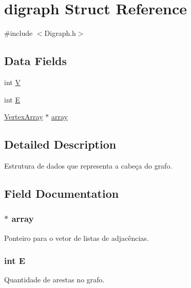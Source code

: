 \hypertarget{structdigraph}{}\section{digraph Struct Reference}
\label{structdigraph}


{\ttfamily \#include $<$Digraph.\+h$>$}

\subsection*{Data Fields}
\begin{DoxyCompactItemize}
\item 
int \hyperlink{structdigraph_a91e334f289dc11ba09da0df4a9c72123}{V}
\item 
int \hyperlink{structdigraph_a105a63272424d04208f33bac739acf98}{E}
\item 
\hyperlink{_digraph_8h_a34d078088dd1f710e4034c3fcb21918e}{Vertex\+Array} $\ast$ \hyperlink{structdigraph_af3759f34fe0a4cdbdbf6f6135e6c9cbe}{array}
\end{DoxyCompactItemize}


\subsection{Detailed Description}
Estrutura de dados que representa a cabeça do grafo. 

\subsection{Field Documentation}
\subsubsection[{\texorpdfstring{array}{array}}]{$\ast$ array}\hypertarget{structdigraph_af3759f34fe0a4cdbdbf6f6135e6c9cbe}{}\label{structdigraph_af3759f34fe0a4cdbdbf6f6135e6c9cbe}
Ponteiro para o vetor de listas de adjacências. 
\subsubsection[{\texorpdfstring{E}{E}}]{\setlength{\rightskip}{0pt plus 5cm}int E}\hypertarget{structdigraph_a105a63272424d04208f33bac739acf98}{}\label{structdigraph_a105a63272424d04208f33bac739acf98}
Quantidade de arestas no grafo. 
